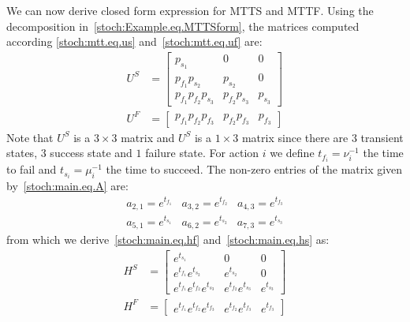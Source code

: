 \begin{example}
We can now derive closed form expression for MTTS and MTTF.
Using the decomposition in~\eqref{stoch:Example.eq.MTTSform}, the matrices computed according \eqref{stoch:mtt.eq.us} and~\eqref{stoch:mtt.eq.uf} are:
\begin{eqnarray}
 U^S&=\left[
\begin{array}{ccc}
p_{s_1} &     0	 & 0 \\ 
p_{f_1}  p_{s_2} &    p_{s_2}&   0\\ 
p_{f_1} p_{f_2} p_{s_3}& p_{f_2} p_{s_3} & p_{s_3}
\end{array} \right]
\\
 U^F&=\left[
\begin{array}{ccc}
 p_{f_1}p_{f_2}p_{f_3}& p_{f_2}p_{f_3} & p_{f_3}
\end{array} \right]
\end{eqnarray}
Note that $U^S$ is a  $3 \times 3$ matrix and $U^S$ is a $1 \times 3$ matrix since there are $3$ transient states, $3$ success state and $1$ failure state.
For action $i$ we define $t_{f_i}= \nu_i^{-1}$ the time to fail and $t_{s_i}= \mu_i^{-1}$ the time to succeed. The non-zero entries of the matrix given by~\eqref{stoch:main.eq.A} are:
\begin{equation}
\begin{split}
a_{2,1}={e}^{t_{f_1}}\;\;\;a_{3,2}={e}^{t_{f_2}}\;\;\;a_{4,3}={e}^{t_{f_3}} \\
a_{5,1}={e}^{t_{s_1}}\;\;\;a_{6,2}={e}^{t_{s_2}}\;\;\;a_{7,3}={e}^{t_{s_3}}
\end{split}
\end{equation}
from which we derive~\eqref{stoch:main.eq.hf} and~\eqref{stoch:main.eq.hs} as:
\begin{eqnarray}
  H^S&=\left[
\begin{array}{ccc}
e^{t_{s_1}}&                0 &        0 \\
e^{t_{f_1}}e^{t_{s_2}}&          e^{t_{s_2}}&        0\\
 e^{t_{f_1}}e^{t_{f_2}}e^{t_{s_3}}& e^{t_{f_2}}e^{t_{s_3}}& e^{t_{s_3}}
\end{array} \right]
\\
  H^F&=\left[
\begin{array}{ccc}
 e^{t_{f_1}}e^{t_{f_2}}e^{t_{f_3}}& e^{t_{f_2}}e^{t_{f_3}}& e^{t_{f_3}}
\end{array} \right]
\end{eqnarray}

\end{example}
